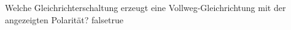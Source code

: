     {Welche Gleichrichterschaltung erzeugt eine Vollweg-Gleichrichtung mit der angezeigten Polarität?}
    {}
    {}
    {}
    {}
    {false}{true}